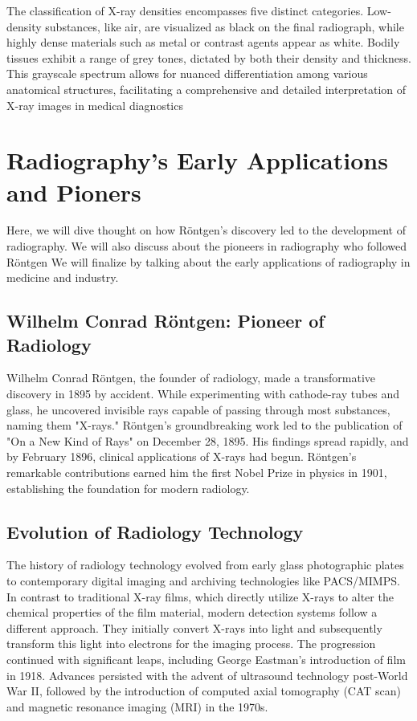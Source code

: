\documentclass[a4paper,12pt]{report}
\begin{document}
The classification of X-ray densities encompasses five distinct categories. Low-density
substances, like air, are visualized as black on the final radiograph, while highly dense materials
such as metal or contrast agents appear as white. Bodily tissues exhibit a range of grey tones,
dictated by both their density and thickness. This grayscale spectrum allows for nuanced
differentiation among various anatomical structures, facilitating a comprehensive and detailed
interpretation of X-ray images in medical diagnostics


\section{Radiography's Early Applications and Pioners}
Here, we will dive thought on how Röntgen's discovery led to the development of radiography. We will also discuss about the pioneers in radiography who followed Röntgen We will finalize by talking about the early applications of radiography in medicine and industry.
\subsection{Wilhelm Conrad Röntgen: Pioneer of Radiology}
Wilhelm Conrad Röntgen, the founder of radiology, made a transformative discovery in 1895 by
accident. While experimenting with cathode-ray tubes and glass, he uncovered invisible rays
capable of passing through most substances, naming them "X-rays." Röntgen's groundbreaking
work led to the publication of "On a New Kind of Rays" on December 28, 1895. His findings spread
rapidly, and by February 1896, clinical applications of X-rays had begun. Röntgen's remarkable
contributions earned him the first Nobel Prize in physics in 1901, establishing the foundation for
modern radiology.

\subsection{Evolution of Radiology Technology}
The history of radiology technology evolved from early glass photographic plates to contemporary
digital imaging and archiving technologies like PACS/MIMPS. In contrast to traditional X-ray
films, which directly utilize X-rays to alter the chemical properties of the film material, modern
detection systems follow a different approach. They initially convert X-rays into light and
subsequently transform this light into electrons for the imaging process. The progression continued
with significant leaps, including George Eastman's introduction of film in 1918. Advances persisted
with the advent of ultrasound technology post-World War II, followed by the introduction of
computed axial tomography (CAT scan) and magnetic resonance imaging (MRI) in the 1970s.
\end{document}
